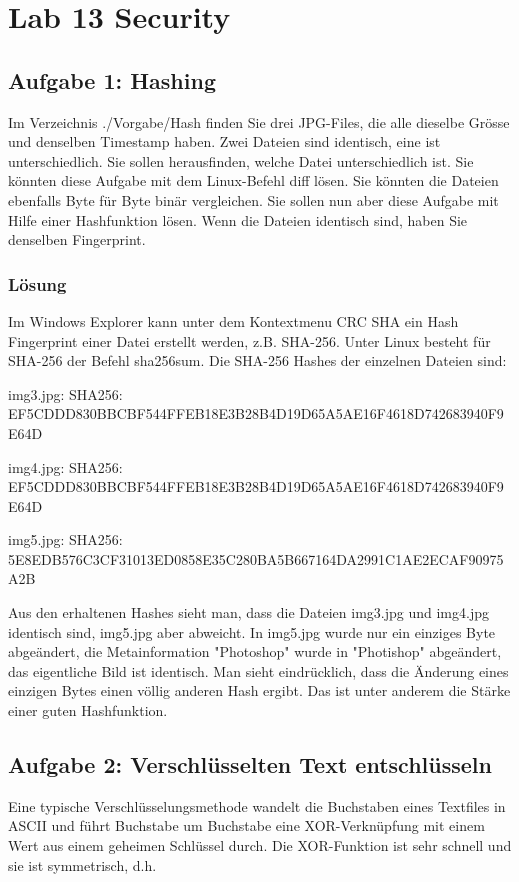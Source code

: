 \section{Lab 13 Security}
\subsection{Aufgabe 1: Hashing}
Im Verzeichnis ./Vorgabe/Hash finden Sie drei JPG-Files, die alle dieselbe Grösse und denselben Timestamp haben. Zwei Dateien sind identisch, eine ist unterschiedlich. Sie sollen herausfinden, welche Datei unterschiedlich ist.
Sie könnten diese Aufgabe mit dem Linux-Befehl diff lösen. Sie könnten die Dateien ebenfalls Byte für Byte binär vergleichen. Sie sollen nun aber diese Aufgabe mit Hilfe einer Hashfunktion lösen. Wenn die Dateien identisch sind, haben Sie denselben Fingerprint.

\subsubsection{Lösung}
Im Windows Explorer kann unter dem Kontextmenu CRC SHA ein Hash Fingerprint einer Datei erstellt werden, z.B. SHA-256. Unter Linux besteht für SHA-256 der Befehl sha256sum. Die SHA-256 Hashes der einzelnen Dateien sind:

img3.jpg: SHA256: EF5CDDD830BBCBF544FFEB18E3B28B4D19D65A5AE16F4618D742683940F9E64D

img4.jpg: SHA256: EF5CDDD830BBCBF544FFEB18E3B28B4D19D65A5AE16F4618D742683940F9E64D

img5.jpg: SHA256: 5E8EDB576C3CF31013ED0858E35C280BA5B667164DA2991C1AE2ECAF90975A2B

Aus den erhaltenen Hashes sieht man, dass die Dateien img3.jpg und img4.jpg identisch sind, img5.jpg aber abweicht. In img5.jpg wurde nur ein einziges Byte abgeändert, die Metainformation "Photoshop" wurde in "Photishop" abgeändert, das eigentliche Bild ist identisch. Man sieht eindrücklich, dass die Änderung eines einzigen Bytes einen völlig anderen Hash ergibt. Das ist unter anderem die Stärke einer guten Hashfunktion.

\subsection{Aufgabe 2: Verschlüsselten Text entschlüsseln}

Eine typische Verschlüsselungsmethode wandelt die Buchstaben eines Textfiles in ASCII und führt Buchstabe um Buchstabe eine XOR-Verknüpfung mit einem Wert aus einem geheimen Schlüssel durch. Die XOR-Funktion ist sehr schnell und sie ist symmetrisch, d.h.

